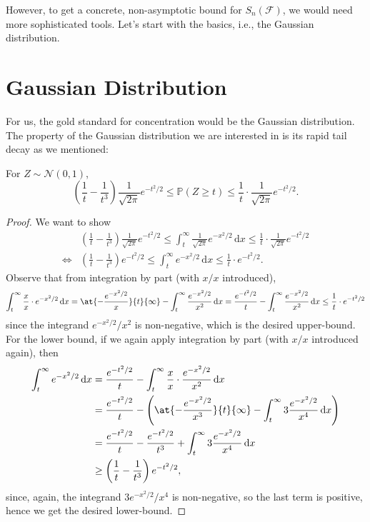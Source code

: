 However, to get a concrete, non-asymptotic bound for \(S_n(\mathscr{F} )\), we would need more sophisticated tools. Let's start with the basics, i.e., the Gaussian distribution.

\section{Gaussian Distribution}
For us, the gold standard for concentration would be the Gaussian distribution. The property of the Gaussian distribution we are interested in is its rapid tail decay as we mentioned:

\begin{lemma}\label{lma:Gaussian-tail-bound}
  For \(Z \sim \mathcal{N} (0, 1)\),
  \[
    \left( \frac{1}{t} - \frac{1}{t^3} \right) \frac{1}{\sqrt{2\pi } } e^{- t^2 / 2} \leq \mathbb{P}(Z \geq t) \leq \frac{1}{t} \cdot \frac{1}{\sqrt{2\pi } } e^{- t^2 / 2}.
  \]
\end{lemma}
\begin{proof}
  We want to show
  \[
    \begin{split}
      &\left( \frac{1}{t} - \frac{1}{t^3} \right) \frac{1}{\sqrt{2\pi } } e^{-t^2 / 2}
      \leq \int_{t}^{\infty} \frac{1}{\sqrt{2\pi } } e^{- x^2 / 2} \,\mathrm{d}x
      \leq \frac{1}{t}\cdot \frac{1}{\sqrt{2\pi } } e^{-t^2 / 2}\\
      \iff &\left( \frac{1}{t} - \frac{1}{t^3} \right) e^{-t^2 / 2}
      \leq \int_{t}^{\infty} e^{- x^2 / 2} \,\mathrm{d}x
      \leq \frac{1}{t}\cdot e^{-t^2 / 2}.
    \end{split}
  \]
  Observe that from integration by part (with \(x / x\) introduced),
  \[
    \int_{t}^{\infty} \frac{x}{x}\cdot e^{-x^2 / 2} \,\mathrm{d}x
    = \at{- \frac{e^{-x^2 / 2}}{x}}{t}{\infty } - \int_{t}^{\infty} \frac{e^{-x^2 / 2}}{x^2} \,\mathrm{d}x
    = \frac{e^{-t^2 / 2}}{t} - \int_{t}^{\infty} \frac{e^{-x^2 / 2}}{x^2} \,\mathrm{d}x
    \leq \frac{1}{t}\cdot e^{-t^2 / 2}
  \]
  since the integrand \(e^{-x^2 / 2} / x^2\) is non-negative, which is the desired upper-bound. For the lower bound, if we again apply integration by part (with \(x / x\) introduced again), then
  \[
    \begin{split}
      \int_{t}^{\infty} e^{-x^2 / 2} \,\mathrm{d}x
      &= \frac{e^{-t^2 / 2}}{t} - \int_{t}^{\infty} \frac{x}{x} \cdot \frac{e^{-x^2 / 2}}{x^2} \,\mathrm{d}x\\
      &= \frac{e^{-t^2 / 2}}{t} - \left( \at{- \frac{e^{-x^2 / 2}}{x^3}}{t}{\infty } - \int_{t}^{\infty} 3 \frac{e^{-x^2 / 2}}{x^4} \,\mathrm{d}x \right)\\
      &= \frac{e^{-t^2 / 2}}{t} - \frac{e^{-t^2 / 2}}{t^3} + \int_{t}^{\infty} 3 \frac{e^{-x^2 / 2}}{x^4} \,\mathrm{d}x\\
      &\geq \left( \frac{1}{t} - \frac{1}{t^3} \right) e^{-t^2 / 2},
    \end{split}
  \]
  since, again, the integrand \(3 e^{-x^2 / 2} / x^4\) is non-negative, so the last term is positive, hence we get the desired lower-bound.
\end{proof}

